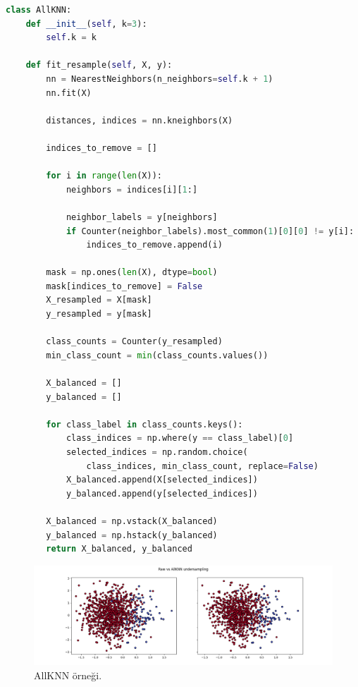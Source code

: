 \begin{lstlisting}[language=Python]
class AllKNN:
    def __init__(self, k=3):
        self.k = k

    def fit_resample(self, X, y):
        nn = NearestNeighbors(n_neighbors=self.k + 1)
        nn.fit(X)

        distances, indices = nn.kneighbors(X)

        indices_to_remove = []

        for i in range(len(X)):
            neighbors = indices[i][1:]

            neighbor_labels = y[neighbors]
            if Counter(neighbor_labels).most_common(1)[0][0] != y[i]:
                indices_to_remove.append(i)

        mask = np.ones(len(X), dtype=bool)
        mask[indices_to_remove] = False
        X_resampled = X[mask]
        y_resampled = y[mask]

        class_counts = Counter(y_resampled)
        min_class_count = min(class_counts.values())

        X_balanced = []
        y_balanced = []

        for class_label in class_counts.keys():
            class_indices = np.where(y == class_label)[0]
            selected_indices = np.random.choice(
                class_indices, min_class_count, replace=False)
            X_balanced.append(X[selected_indices])
            y_balanced.append(y[selected_indices])

        X_balanced = np.vstack(X_balanced)
        y_balanced = np.hstack(y_balanced)
        return X_balanced, y_balanced
\end{lstlisting}

\begin{figure}[h]
    \centering
    \includegraphics[width=1\textwidth]{images/Raw vs AllKNN undersampling.png}
    \caption{AllKNN örneği.}
    \label{fig:enter-label}
\end{figure}

\newpage

